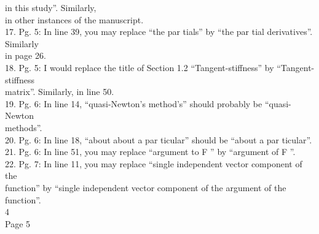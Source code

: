 in this study''. Similarly, \\in other instances of the manuscript.
\\17. Pg. 5: In line 39, you may replace ``the par tials'' by ``the par
tial derivatives''. Similarly \\in page 26. \\18. Pg. 5: I would replace
the title of Section 1.2 ``Tangent-stiffness'' by ``Tangent-stiffness
\\matrix''. Similarly, in line 50. \\19. Pg. 6: In line 14,
``quasi-Newton's method's'' should probably be ``quasi-Newton
\\methods''. \\20. Pg. 6: In line 18, ``about about a par ticular''
should be ``about a par ticular''. \\21. Pg. 6: In line 51, you may
replace ``argument to F '' by ``argument of F ''. \\22. Pg. 7: In line
11, you may replace ``single independent vector component of the
\\function'' by ``single independent vector component of the argument of
the function''. \\

4 \\

Page 5


